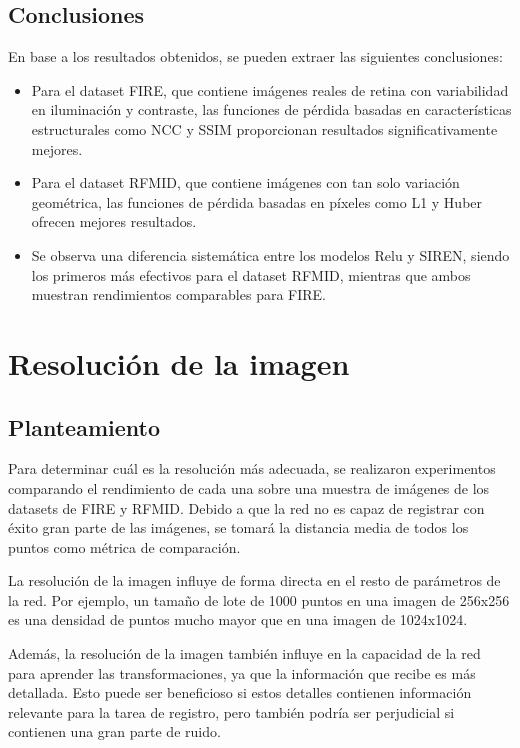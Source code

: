 \subsection{Conclusiones}
\label{subsec:Conclusions-loss}

En base a los resultados obtenidos, se pueden extraer las siguientes conclusiones:
\begin{itemize}
    \item Para el dataset FIRE, que contiene imágenes reales de retina con variabilidad en iluminación y contraste, las funciones de pérdida basadas en características estructurales como NCC y SSIM proporcionan resultados significativamente mejores.
    \item Para el dataset RFMID, que contiene imágenes con tan solo variación geométrica, las funciones de pérdida basadas en píxeles como L1 y Huber ofrecen mejores resultados.
    \item Se observa una diferencia sistemática entre los modelos Relu y SIREN, siendo los primeros más efectivos para el dataset RFMID, mientras que ambos muestran rendimientos comparables para FIRE.
\end{itemize}

\section{Resolución de la imagen}
\label{sec:Resolución de la imagen}

\subsection{Planteamiento}
\label{subsec:Planteamiento-resolution}

Para determinar cuál es la resolución más adecuada, se realizaron experimentos comparando el rendimiento de cada una sobre una muestra de imágenes de los datasets de FIRE y RFMID.
Debido a que la red no es capaz de registrar con éxito gran parte de las imágenes, se tomará la distancia media de todos los puntos como métrica de comparación.

La resolución de la imagen influye de forma directa en el resto de parámetros de la red.
Por ejemplo, un tamaño de lote de 1000 puntos en una imagen de 256x256 es una densidad de puntos mucho mayor que en una imagen de 1024x1024.

Además, la resolución de la imagen también influye en la capacidad de la red para aprender las transformaciones, ya que la información que recibe es más detallada.
Esto puede ser beneficioso si estos detalles contienen información relevante para la tarea de registro, pero también podría ser perjudicial si contienen una gran parte de ruido.

